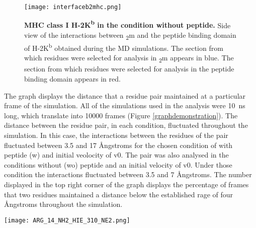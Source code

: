 \documentclass[11pt,twocolumn]{article}
\def\plus{\texttt{+}}
\newcommand{\kb}{H-2K\textsuperscript{b}\xspace}
\newcommand{\angstr}{{\AA}ngstroms\xspace}
\newcommand{\btm}{\textbeta\textsubscript{2}m\xspace}
\begin{document}
\begin{figure}
\texttt{[image: interfaceb2mhc.png]}
\caption{\textbf{MHC class I \kb in the condition without peptide.} Side view of the interactions between \btm and the peptide binding domain of \kb obtained during the MD simulations. The section from which residues were selected for analysis in \btm appears in blue. The section from which residues were selected for analysis in the peptide binding domain appears in red.}
\label{interface}
\end{figure}

The graph displays the distance that a residue pair maintained at a particular frame of the simulation. All of the simulations used in the analysis were \SI{10}{\nano\second} long, which translate into 10000 frames (Figure \ref{graphdemonstration}). The distance between the residue pair, in each condition, fluctuated throughout the simulation. In this case, the interactions between the residues of the pair fluctuated between 3.5  and  17 \angstr for the chosen condition of with peptide (w) and initial veolocity of v0. The pair was also analysed in the conditions without (wo) peptide and an initial velocity of v0. Under those condition the interactions   fluctuated between 3.5  and  7 \angstr.
The number displayed in the top right corner of the graph displays the percentage of frames that two residues maintained a distance  below the established rage of four \angstr throughout the simulation. 

\begin{figure*}
\begin{center}
\texttt{[image: ARG\_14\_NH2\_HIE\_310\_NE2.png]}
\caption{\textbf{Example of a graph generated by \texttt{gnuplot} after processing the first line in the residue pair file (Listing \ref{resatexample}) with the two scripts (Listing \ref{Tcl.script} and \ref{generategnuplot.sh}).} The distance between the two interacting atoms for each of the two residue pairs represented in every frame of the simulation as $\plus$ or a $\times$. One pair was analysed in the conditions with peptide and initial velocity of v0. The other pair was analysed in the conditions without peptide and initial velocity of v0. The percentage calculated in Listing \ref{generategnuplot.sh} is displayed in the top right corner and the name of the analysed pair can be seen on the top of the graph. The blue line indicates the 4 \angstr cutoff value.}
\label{graphdemonstration}
\end{center}
\end{figure*}
\end{document}

